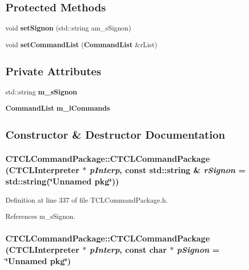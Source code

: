 \subsection*{Protected Methods}
\begin{CompactItemize}
\item 
void {\bf set\-Signon} (std::string am\_\-s\-Signon)
\item 
void {\bf set\-Command\-List} ({\bf Command\-List} \&r\-List)
\end{CompactItemize}
\subsection*{Private Attributes}
\begin{CompactItemize}
\item 
std::string {\bf m\_\-s\-Signon}
\item 
{\bf Command\-List} {\bf m\_\-l\-Commands}
\end{CompactItemize}


\subsection{Constructor \& Destructor Documentation}
\subsubsection{\setlength{\rightskip}{0pt plus 5cm}CTCLCommand\-Package::CTCLCommand\-Package ({\bf CTCLInterpreter} $\ast$ {\em p\-Interp}, const std::string \& {\em r\-Signon} = std::string(\char`\"{}Unnamed pkg\char`\"{}))\hspace{0.3cm}{\tt  [inline]}}\label{classCTCLCommandPackage_a0}




Definition at line 337 of file TCLCommand\-Package.h.

References m\_\-s\-Signon.
\subsubsection{\setlength{\rightskip}{0pt plus 5cm}CTCLCommand\-Package::CTCLCommand\-Package ({\bf CTCLInterpreter} $\ast$ {\em p\-Interp}, const char $\ast$ {\em p\-Signon} = \char`\"{}Unnamed pkg\char`\"{})\hspace{0.3cm}{\tt  [inline]}}\label{classCTCLCommandPackage_a1}




